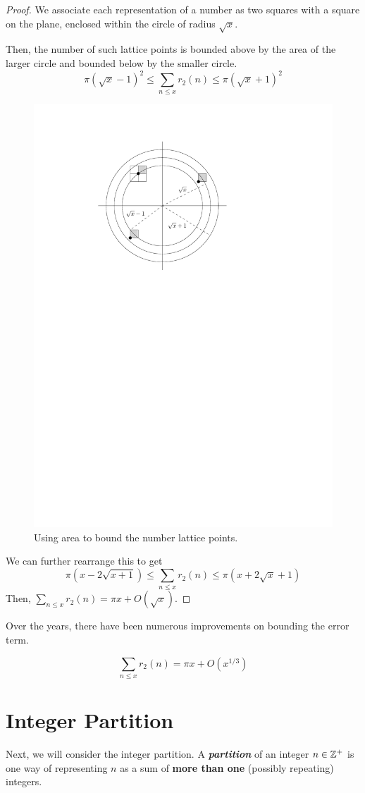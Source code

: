 \begin{proof}
    We associate each representation of a number as two squares with a square on the plane, enclosed within the circle of radius $\sqrt{x}$.

    Then, the number of such lattice points is bounded above by the area of the larger circle and bounded below by the smaller circle.
    $$
    \pi(\sqrt{x} - 1)^2 \leq \sum_{n \leq x}r_2(n) \leq \pi(\sqrt{x} + 1)^2
    $$
    \begin{figure}[htbp]
        \centering
        \includegraphics[width=.4\linewidth]{figures/gauss-circle-area.pdf}
        \caption{Using area to bound the number lattice points.}
        \label{fig:gauss-circle-area}
    \end{figure} 
    We can further rearrange this to get
    $$
    \pi(x - 2\sqrt{x+1}) \leq \sum_{n \leq x} r_2(n) \leq \pi(x + 2\sqrt{x} + 1)
    $$
    Then, $\sum_{n\leq x}r_2(n) = \pi x + O(\sqrt{x})$. 
\end{proof}

Over the years, there have been numerous improvements on bounding the error term.

\begin{theorem}[Sierpinski 1906]
    $$
    \sum_{n \leq x} r_2(n) = \pi x + O(x^{1/3})
    $$
\end{theorem}

\section{Integer Partition}

Next, we will consider the integer partition. A \textit{\textbf{partition}} of an integer $n \in \mathbb{Z}^+$ is one way of representing $n$ as a sum of \textbf{more than one} (possibly repeating) integers.

